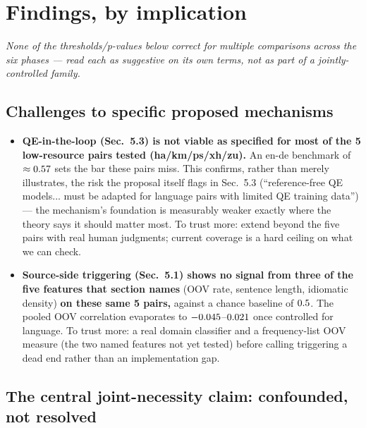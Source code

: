 \documentclass[11pt]{article}
\begin{document}
\section*{Findings, by implication}

\noindent\footnotesize\textit{None of the thresholds/p-values below correct for multiple
comparisons across the six phases --- read each as suggestive on its own terms, not as part of a
jointly-controlled family.}\normalsize

\subsection*{Challenges to specific proposed mechanisms}

\begin{itemize}
  \item \textbf{QE-in-the-loop (Sec.~5.3) is not viable as specified for most of the
    5 low-resource pairs tested (ha/km/ps/xh/zu).} An en-de benchmark of $\approx0.57$ sets the bar these
    pairs miss. This confirms, rather than merely illustrates, the risk the proposal itself
    flags in Sec.~5.3 (``reference-free QE models... must be adapted for language pairs with
    limited QE training data'') --- the mechanism's foundation is measurably weaker exactly
    where the theory says it should matter most. To trust more: extend beyond the five pairs
    with real human judgments; current coverage is a hard ceiling on what we can check.
  \item \textbf{Source-side triggering (Sec.~5.1) shows no signal from three of the five
    features that section names} (OOV rate, sentence length, idiomatic density) \textbf{on
    these same 5 pairs,} against a chance baseline of $0.5$. The pooled OOV
    correlation evaporates to $-0.045$--$0.021$ once controlled
    for language. To trust more: a real domain classifier and a frequency-list OOV measure
    (the two named features not yet tested) before calling triggering a dead end rather than
    an implementation gap.
\end{itemize}

\subsection*{The central joint-necessity claim: confounded, not resolved}
\end{document}
